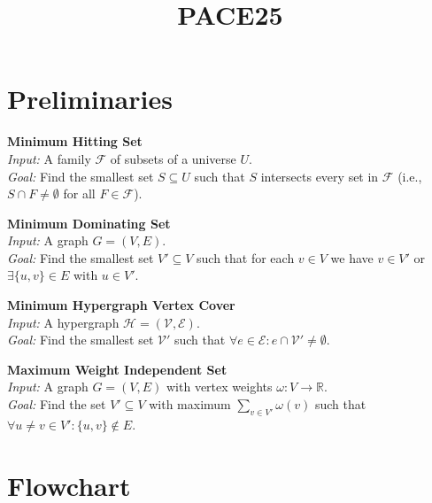 \documentclass[11pt]{article}
\title{PACE25}
\newcommand{\problem}[3]{
    \vspace{1em}
    \noindent\textbf{#1} \\
    \textit{Input:} #2 \\
    \textit{Goal:} #3
}
\begin{document}
    \maketitle
    
    \section{Preliminaries}\label{sec:preliminaries}
    \problem{Minimum Hitting Set}
    {A family $\mathcal{F}$ of subsets of a universe $U$.}
    {Find the smallest set $S \subseteq U$ such that $S$ intersects every set in $\mathcal{F}$ (i.e., $S \cap F \neq \emptyset$ for all $F \in \mathcal{F}$).}

    \problem{Minimum Dominating Set}
    {A graph $G=(V, E)$.}
    {Find the smallest set $V' \subseteq V$ such that for each $v \in V$ we have $v \in V'$ or $\exists \{u, v\} \in E$ with $u \in V'$.}

    \problem{Minimum Hypergraph Vertex Cover}
    {A hypergraph $\mathcal{H} = (\mathcal{V}, \mathcal{E})$.}
    {Find the smallest set $\mathcal{V}'$ such that $\forall e \in \mathcal{E} : e \cap \mathcal{V}' \neq \emptyset$.}

    \problem{Maximum Weight Independent Set}
    {A graph $G=(V, E)$ with vertex weights $\omega : V \to \mathbb{R}$.}
    {Find the set $V' \subseteq V$ with maximum $\sum_{v \in V'} \omega(v)$ such that $\forall u \neq v \in V': \{u, v\} \notin E$.}

    \section{Flowchart}\label{sec:flowchart}
    
\end{document}
